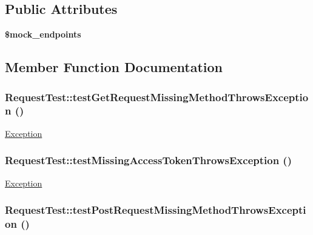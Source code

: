 \subsection*{Public Attributes}
\begin{DoxyCompactItemize}
\item 
{\bfseries \$mock\_\-endpoints}
\end{DoxyCompactItemize}


\subsection{Member Function Documentation}
\hypertarget{classRequestTest_ac564f79430de3857c4215fe4a966888f}{
\subsubsection[{testGetRequestMissingMethodThrowsException}]{\setlength{\rightskip}{0pt plus 5cm}RequestTest::testGetRequestMissingMethodThrowsException ()}}
\label{classRequestTest_ac564f79430de3857c4215fe4a966888f}
\hyperlink{classException}{Exception} \hypertarget{classRequestTest_a94778dc2c6b1a05166604289a01ef918}{
\subsubsection[{testMissingAccessTokenThrowsException}]{\setlength{\rightskip}{0pt plus 5cm}RequestTest::testMissingAccessTokenThrowsException ()}}
\label{classRequestTest_a94778dc2c6b1a05166604289a01ef918}
\hyperlink{classException}{Exception} \hypertarget{classRequestTest_a9ea34bc4bf4394c214013d651e819ef2}{
\subsubsection[{testPostRequestMissingMethodThrowsException}]{\setlength{\rightskip}{0pt plus 5cm}RequestTest::testPostRequestMissingMethodThrowsException ()}}
